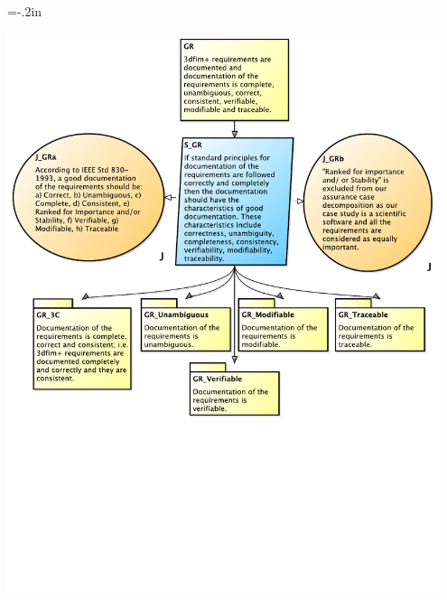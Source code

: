 \documentclass[t,12pt,numbers,fleqn]{beamer}
\begin{document}
\hoffset=-.2in
\begin{frame}[plain]

\includegraphics[width=0.95\textwidth]{../Figures/GRTop.pdf}

\end{frame}
\hoffset=0in

\end{document}
